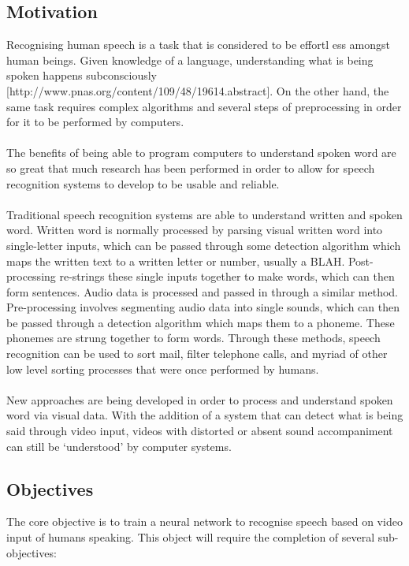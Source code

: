 \documentclass[12pt,twoside]{report}
\begin{document}
	\subsection{Motivation}
Recognising human speech is a task that is considered to be effortl	ess amongst human beings. Given knowledge of a language, understanding what is being spoken happens subconsciously [http://www.pnas.org/content/109/48/19614.abstract]. On the other hand, the same task requires complex algorithms and several steps of preprocessing in order for it to be performed by computers. 
\\ \\
The benefits of being able to program computers to understand spoken word are so great that much research has been performed in order to allow for speech recognition systems to develop to be usable and reliable. 
\\ \\
Traditional speech recognition systems are able to understand written and spoken word. Written word is normally processed by parsing visual written word into single-letter inputs, which can be passed through some detection algorithm which maps the written text to a written letter or number, usually a BLAH. Post-processing re-strings these single inputs together to make words, which can then form sentences. Audio data is processed and passed in through a similar method. Pre-processing involves segmenting audio data into single sounds, which can then be passed through a detection algorithm which maps them to a phoneme. These phonemes are strung together to form words. Through these methods, speech recognition can be used to sort mail, filter telephone calls, and myriad of other low level sorting processes that were once performed by humans. 
\\ \\
New approaches are being developed in order to process and understand spoken word via visual data. With the addition of a system that can detect what is being said through video input, videos with distorted or absent sound accompaniment can still be ‘understood’ by computer systems. 

	\subsection{Objectives}
The core objective is to train a neural network to recognise speech based on video input of humans speaking. This object will require the completion of several sub-objectives: 
\end{document}
